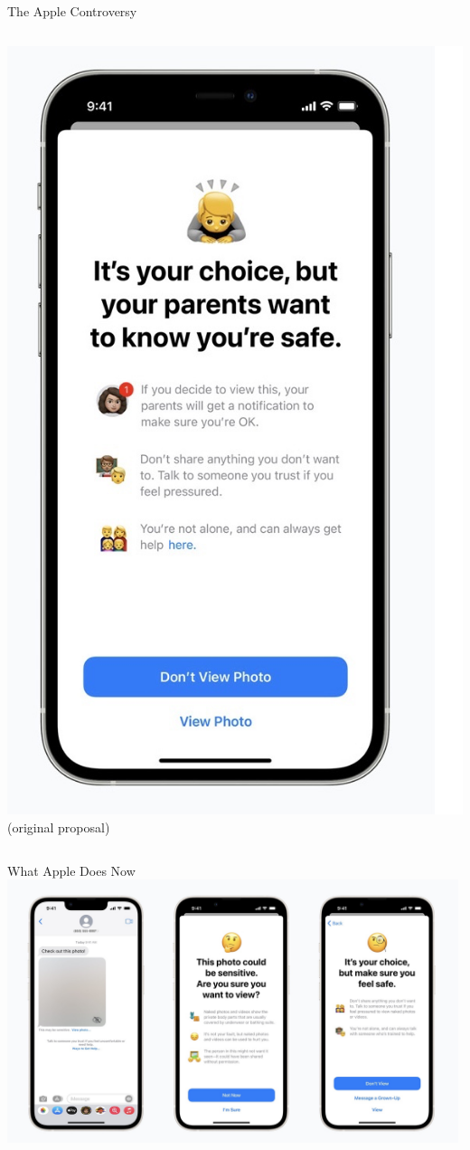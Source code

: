\documentclass[nobackground,dvipsnames,table,aspectratio=169]{beamer}
\begin{document}
\begin{frame}{The Apple Controversy}
\begin{columns}
            \includegraphics[width=\textwidth]{apple-controversy-1}
            (original proposal)
    \end{columns}
\end{frame}

\begin{frame}{What Apple Does Now}
    \includegraphics[width=0.99\textwidth]{apple-controversy-2}
\end{frame}
\end{document}
